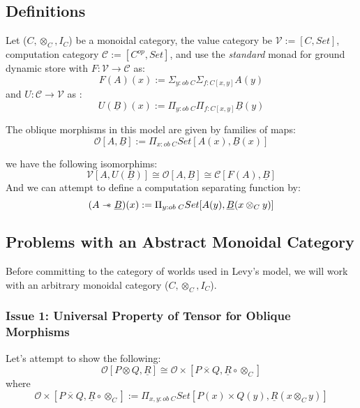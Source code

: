 \documentclass{article}
\newcommand{\sep}{\mathrel{-\mkern-6mu*}}
\begin{document}
\subsection{Definitions}
Let ($C, \otimes_C , I_C$) be a monoidal category, the value category be $\mathcal{V} := [C , Set]$, computation category $\mathcal{C} := [C^{op}, Set]$, and use the \textit{standard}
monad for ground dynamic store with $F : \mathcal{V} \rightarrow \mathcal{C}$ as:
\[
    F(A)(x) := \Sigma_{y : ob \;C}\Sigma_{f : C[ x , y ]}A(y)    
\]
and $U : \mathcal{C} \rightarrow \mathcal{V}$ as :
\[
    U(\underline{B})(x) := \Pi_{y : ob \; C}\Pi_{f : C [ x , y]}\underline{B}(y)   
\]

The oblique morphisms in this model are given by families of maps:
\[
    \mathcal{O}[A , \underline{B}] := \Pi_{x : ob \; C} Set[A(x) , \underline{B}(x)]   
\]

we have the following isomorphims:
\[
    \mathcal{V}[A , U(\underline{B})] \cong \mathcal{O}[A , \underline{B}] \cong \mathcal{C}[F(A) , \underline{B}]   
\]
And we can attempt to define a computation separating function by:
\[
    (A \sep \underline{B})(x) := \Pi_{y : ob \;C} Set[A(y), \underline{B}(x \otimes_C y)]
\]
\subsection{Problems with an Abstract Monoidal Category}
Before committing to the category 
of worlds used in Levy's model, we will work with an arbitrary monoidal category ($C, \otimes_C , I_C$). 
\subsubsection{Issue 1: Universal Property of Tensor for Oblique Morphisms}
Let's attempt to show the following:
\[
  \mathcal{O}[P \otimes Q , \underline{R}] \cong \mathcal{O\times}[P \overline{\times} Q , \underline{R} \circ \otimes_C]  
\]
where 
\[
    \mathcal{O\times}[P \overline{\times} Q , \underline{R} \circ \otimes_C] 
    := \Pi_{x , y : ob \;C}Set[P(x)\times Q(y) , \underline{R}(x \otimes_C y)]
\]
\end{document}
